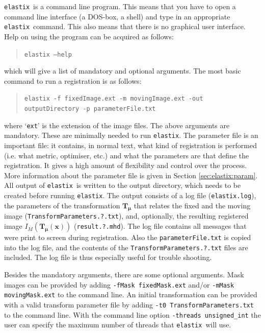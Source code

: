 \documentclass[]{report}
\newcommand{\elastix}{\texttt{elastix}}
\newcommand{\vmu}{\bm{\mu}}
\newcommand{\vT}{\bm{T}}
\newcommand{\vTmx}{\bm{T}_{\vmu}(\bm{x})}
\begin{document}
\elastix\ is a command line program. This means that you have to
open a command line interface (a DOS-box, a shell) and type in an
appropriate \elastix\ command. This also means that there is no
graphical user interface. Help on using the program can be acquired
as follows:
\begin{quote}
\texttt{elastix --help}
\end{quote}
which will give a list of mandatory and optional arguments. The most
basic command to run a registration is as follows:
\begin{quote}
\texttt{elastix -f fixedImage.ext -m movingImage.ext -out
outputDirectory -p parameterFile.txt}
\end{quote}
where `\texttt{ext}' is the extension of the image files. The above
arguments are mandatory. These are minimally needed to run \elastix.
The parameter file is an important file: it contains, in normal
text, what kind of registration is performed (i.e. what metric,
optimiser, etc.) and what the parameters are that define the
registration. It gives a high amount of flexibility and control over
the process. More information about the parameter file is given in
Section \ref{sec:elastix:param}. All output of \elastix\ is written
to the output directory, which needs to be created before running
\elastix. The output consists of a log file (\texttt{elastix.log}),
the parameters of the transformation $\vT_{\vmu}$ that relates the
fixed and the moving image (\texttt{TransformParameters.?.txt}),
and, optionally, the resulting registered image $I_M(\vTmx)$
(\texttt{result.?.mhd}). The log file contains all messages that
were print to screen during registration. Also the
\texttt{parameterFile.txt} is copied into the log file, and the
contents of the \texttt{TransformParameters.?.txt} files are
included. The log file is thus especially useful for trouble
shooting.

Besides the mandatory arguments, there are some optional
arguments. Mask images can be provided by adding \texttt{-fMask
fixedMask.ext} and/or \texttt{-mMask movingMask.ext} to the
command line. An initial transformation can be provided with a
valid transform parameter file by adding \texttt{-t0
TransformParameters.txt} to the command line. With the command
line option \texttt{-threads unsigned\_int} the user can specify
the maximum number of threads that \elastix\ will use.
\end{document}
